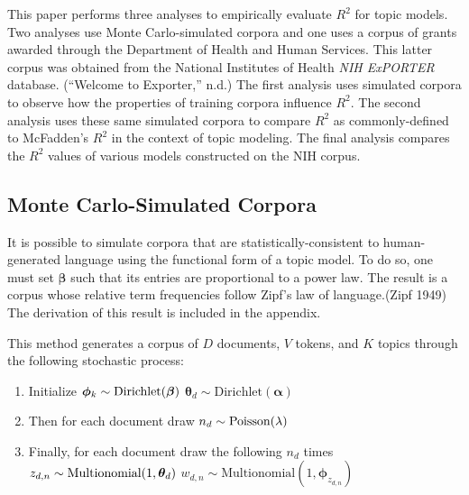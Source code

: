 \documentclass[conference,final,]{IEEEtran}
\providecommand{\tightlist}{%
  \setlength{\itemsep}{0pt}\setlength{\parskip}{0pt}}
\begin{document}
This paper performs three analyses to empirically evaluate \(R^2\) for
topic models. Two analyses use Monte Carlo-simulated corpora and one
uses a corpus of grants awarded through the Department of Health and
Human Services. This latter corpus was obtained from the National
Institutes of Health \emph{NIH ExPORTER} database. (``Welcome to
Exporter,'' n.d.) The first analysis uses simulated corpora to observe
how the properties of training corpora influence \(R^2\). The second
analysis uses these same simulated corpora to compare \(R^2\) as
commonly-defined to McFadden's \(R^2\) in the context of topic modeling.
The final analysis compares the \(R^2\) values of various models
constructed on the NIH corpus.

\hypertarget{monte-carlo-simulated-corpora}{%
\subsection{Monte Carlo-Simulated
Corpora}\label{monte-carlo-simulated-corpora}}

It is possible to simulate corpora that are statistically-consistent to
human-generated language using the functional form of a topic model. To
do so, one must set \(\boldsymbol\beta\) such that its entries are
proportional to a power law. The result is a corpus whose relative term
frequencies follow Zipf's law of language.(Zipf 1949) The derivation of
this result is included in the appendix.

This method generates a corpus of \(D\) documents, \(V\) tokens, and
\(K\) topics through the following stochastic process:

\begin{enumerate}
\def\labelenumi{\arabic{enumi}.}
\tightlist
\item
  Initialize
  \(\\ \boldsymbol\phi_k \sim \text{Dirichlet}(\boldsymbol\beta)\\\)
  \(\boldsymbol\theta_d \sim \text{Dirichlet}(\boldsymbol\alpha)\)
\item
  Then for each document draw \(\\ n_d \sim \text{Poisson}(\lambda)\)
\item
  Finally, for each document draw the following \(n_d\) times
  \(\\ z_{d,n} \sim \text{Multionomial}(1, \boldsymbol\theta_d)\\\)
  \(w_{d,n} \sim \text{Multionomial}(1, \boldsymbol\phi_{z_{d,n}})\)
\end{enumerate}
\end{document}
